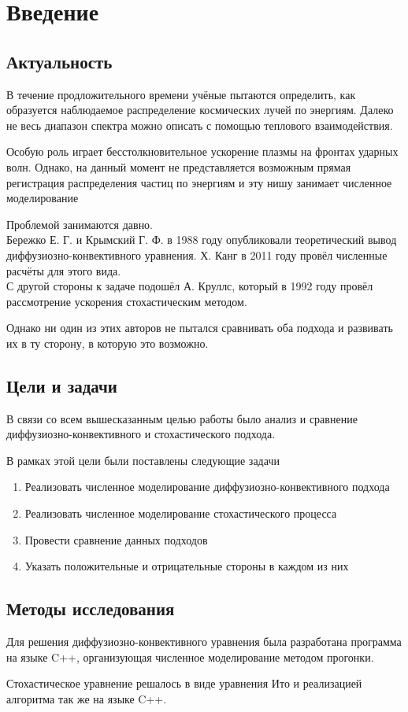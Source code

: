 \documentclass[a4paper,11pt]{article} %
\begin{document}
\tableofcontents
\newpage
\section{Введение}
\subsection{Актуальность}
В течение продложительного времени учёные пытаются определить, как образуется наблюдаемое распределение космических лучей по энергиям. Далеко не весь диапазон спектра можно описать с помощью теплового взаимодействия.

Особую роль играет бесстолкновительное ускорение плазмы на фронтах ударных волн. Однако, на данный момент не представляется возможным прямая регистрация распределения частиц по энергиям и эту нишу занимает численное моделирование

Проблемой занимаются давно.\\
 Бережко Е. Г. и Крымский Г. Ф. в 1988 году опубликовали теоретический вывод диффузиозно-конвективного уравнения. Х. Канг в 2011 году провёл численные расчёты для этого вида. \\ 
С другой стороны к задаче подошёл А. Круллс, который в 1992 году провёл рассмотрение ускорения стохастическим методом. 

Однако ни один из этих авторов не пытался сравнивать оба подхода и развивать их в ту сторону, в которую это возможно.

\subsection{Цели и задачи}
В связи со всем вышесказанным целью работы было анализ и сравнение диффузиозно-конвективного и стохастического подхода.

В рамках этой цели были поставлены следующие задачи
\begin{enumerate}
\item Реализовать численное моделирование диффузиозно-конвективного подхода
\item Реализовать численное моделирование стохастического процесса
\item Провести сравнение данных подходов
\item Указать положительные и отрицательные стороны в каждом из них
\end{enumerate}

\subsection{Методы исследования}
Для решения диффузиозно-конвективного уравнения была разработана программа на языке C++, организующая численное моделирование методом прогонки.

Стохастическое уравнение решалось в виде уравнения Ито и реализацией алгоритма так же на языке C++.

\end{document}
